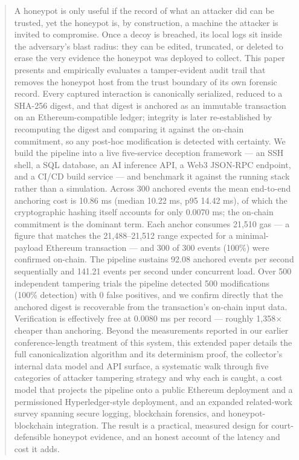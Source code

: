 \documentclass[journal]{IEEEtran}
\begin{document}
\begin{abstract}
A honeypot is only useful if the record of what an attacker did can be trusted, yet the honeypot is, by construction, a machine the attacker is invited to compromise. Once a decoy is breached, its local logs sit inside the adversary's blast radius: they can be edited, truncated, or deleted to erase the very evidence the honeypot was deployed to collect. This paper presents and empirically evaluates a tamper-evident audit trail that removes the honeypot host from the trust boundary of its own forensic record. Every captured interaction is canonically serialized, reduced to a SHA-256 digest, and that digest is anchored as an immutable transaction on an Ethereum-compatible ledger; integrity is later re-established by recomputing the digest and comparing it against the on-chain commitment, so any post-hoc modification is detected with certainty. We build the pipeline into a live five-service deception framework --- an SSH shell, a SQL database, an AI inference API, a Web3 JSON-RPC endpoint, and a CI/CD build service --- and benchmark it against the running stack rather than a simulation. Across 300 anchored events the mean end-to-end anchoring cost is 10.86 ms (median 10.22 ms, p95 14.42 ms), of which the cryptographic hashing itself accounts for only 0.0070 ms; the on-chain commitment is the dominant term. Each anchor consumes 21,510 gas --- a figure that matches the 21,488--21,512 range expected for a minimal-payload Ethereum transaction --- and 300 of 300 events (100\%) were confirmed on-chain. The pipeline sustains 92.08 anchored events per second sequentially and 141.21 events per second under concurrent load. Over 500 independent tampering trials the pipeline detected 500 modifications (100\% detection) with 0 false positives, and we confirm directly that the anchored digest is recoverable from the transaction's on-chain input data. Verification is effectively free at 0.0080 ms per record --- roughly 1,358$\times$ cheaper than anchoring. Beyond the measurements reported in our earlier conference-length treatment of this system, this extended paper details the full canonicalization algorithm and its determinism proof, the collector's internal data model and API surface, a systematic walk through five categories of attacker tampering strategy and why each is caught, a cost model that projects the pipeline onto a public Ethereum deployment and a permissioned Hyperledger-style deployment, and an expanded related-work survey spanning secure logging, blockchain forensics, and honeypot-blockchain integration. The result is a practical, measured design for court-defensible honeypot evidence, and an honest account of the latency and cost it adds.
\end{abstract}
\end{document}
